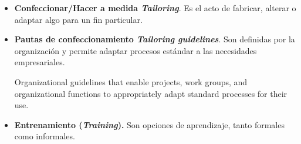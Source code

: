 \begin{itemize}
\item \textbf{Confeccionar/Hacer a medida \textit{Tailoring}}. Es el acto de fabricar, alterar o adaptar algo para un fin particular.

\item \textbf{Pautas de confeccionamiento \textit{Tailoring guidelines}}. Son definidas por la organización y permite adaptar procesos estándar a las necesidades empresariales.

Organizational guidelines that enable projects, work groups,
and organizational functions to appropriately adapt standard
processes for their use.
\item \textbf{Entrenamiento (\textit{Training}).} Son opciones de aprendizaje, tanto formales como informales.
\end{itemize}